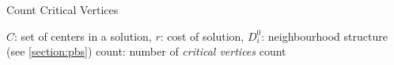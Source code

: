 \begin{algorithm}[H] 
\caption{Count Critical Vertices}
\label{alg:count_cv}
\begin{algorithmic}[1]
\Require $C$: set of centers in a solution, $r$: cost of solution, $D_i^0$: neighbourhood structure (see \cref{section:pbs})
\Ensure count: number of \emph{critical vertices}
        \EndIf
    \EndFor
    \State \Return count
\EndFunction
\end{algorithmic}
\end{algorithm}
